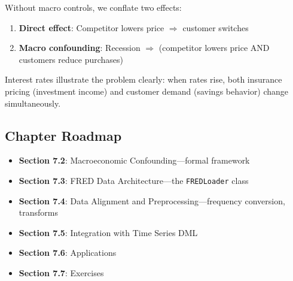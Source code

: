 Without macro controls, we conflate two effects:
\begin{enumerate}
    \item \textbf{Direct effect}: Competitor lowers price $\Rightarrow$ customer switches
    \item \textbf{Macro confounding}: Recession $\Rightarrow$ (competitor lowers price AND customers reduce purchases)
\end{enumerate}

Interest rates illustrate the problem clearly: when rates rise, both insurance pricing (investment income) and customer demand (savings behavior) change simultaneously.


\subsection{Chapter Roadmap}

\begin{itemize}
    \item \textbf{Section 7.2}: Macroeconomic Confounding---formal framework
    \item \textbf{Section 7.3}: FRED Data Architecture---the \texttt{FREDLoader} class
    \item \textbf{Section 7.4}: Data Alignment and Preprocessing---frequency conversion, transforms
    \item \textbf{Section 7.5}: Integration with Time Series DML
    \item \textbf{Section 7.6}: Applications
    \item \textbf{Section 7.7}: Exercises
\end{itemize}

